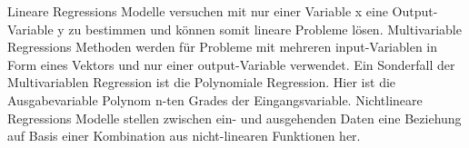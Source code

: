	Lineare Regressions Modelle versuchen mit nur einer Variable x eine Output-Variable y zu bestimmen und können somit lineare Probleme lösen. \cite{Sarkar2018}
	\newline
	Multivariable Regressions Methoden werden für Probleme mit mehreren input-Variablen in Form eines Vektors und nur einer output-Variable verwendet. \cite{Sarkar2018}
	 \newline
	Ein Sonderfall der Multivariablen Regression ist die Polynomiale Regression. Hier ist die Ausgabevariable Polynom n-ten Grades der Eingangsvariable. \cite{Sarkar2018}
	\newline
	Nichtlineare Regressions Modelle stellen zwischen ein- und ausgehenden Daten eine Beziehung auf Basis einer Kombination aus nicht-linearen Funktionen her. \cite{Sarkar2018}
	\newline
	
	